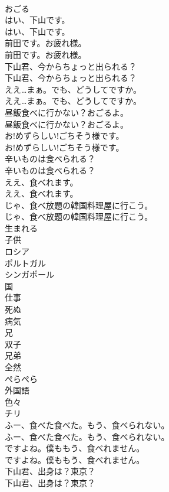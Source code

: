 \documentclass[8pt]{extreport}
\begin{document}
\begin{CJK}{UTF8}{min}
\\	おごる
\\	はい、下山です。	
\\	はい、下山です。 
\\	前田です。お疲れ様。	
\\	前田です。お疲れ様。 
\\	下山君、今からちょっと出られる？	
\\	下山君、今からちょっと出られる？ 
\\	ええ…まぁ。でも、どうしてですか。	
\\	ええ…まぁ。でも、どうしてですか。 
\\	昼飯食べに行かない？おごるよ。	
\\	昼飯食べに行かない？おごるよ。 
\\	お!めずらしい!ごちそう様です。	
\\	お!めずらしい!ごちそう様です。 
\\	辛いものは食べられる？	
\\	辛いものは食べられる？ 
\\	ええ、食べれます。	
\\	ええ、食べれます。 
\\	じゃ、食べ放題の韓国料理屋に行こう。	
\\	じゃ、食べ放題の韓国料理屋に行こう。 
\\	生まれる
\\	子供
\\	ロシア
\\	ポルトガル
\\	シンガポール
\\	国
\\	仕事
\\	死ぬ
\\	病気
\\	兄
\\	双子
\\	兄弟
\\	全然
\\	ぺらぺら
\\	外国語
\\	色々
\\	チリ
\\	ふー、食べた食べた。もう、食べられない。	
\\	ふー、食べた食べた。もう、食べられない。 
\\	ですよね。僕ももう、食べれません。	
\\	ですよね。僕ももう、食べれません。 
\\	下山君、出身は？東京？	
\\	下山君、出身は？東京？ 

\end{CJK}
\end{document}
